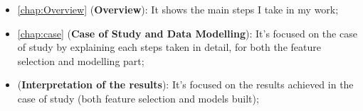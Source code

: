 \begin{itemize}
  \item \autoref{chap:Overview} (\textbf{Overview}): It shows the main steps I take in my work;
  \item \autoref{chap:case} (\textbf{Case of Study and Data Modelling}): It's focused on the case of study by explaining each steps taken in detail, for both the feature selection and modelling part;
 \item (\textbf{Interpretation of the results}): It's focused on the results achieved in the case of study (both feature selection and models built);
\end{itemize}

\begin{comment}
Indeed, in recent years ensemble feature selection are being implemented by researchers  
approaches are being developed by researchers. They follow a similar recipe with the well-established ensemble on classification algorithms, which provides better results and robustness than employing single algorithms
\end{comment}



